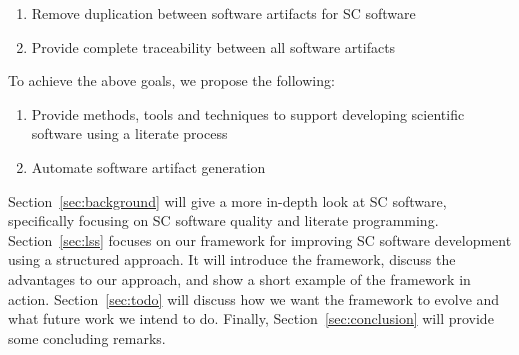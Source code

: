 \documentclass{sig-alternate-05-2015}
\begin{document}
\begin{enumerate}
\item Remove duplication between software artifacts for SC
  software \cite{WilsonEtAl2013}
\item Provide complete traceability between all software artifacts
\end{enumerate}


To achieve the above goals, we propose the following:

\begin{enumerate}
\item Provide methods, tools and techniques to support developing scientific
  software using a literate process
\item Automate software artifact generation
\end{enumerate}

Section~\ref{sec:background} will give a more in-depth look at SC software,
specifically focusing on SC software quality and literate programming. 
Section~\ref{sec:lss} focuses on our framework %
for improving SC software development using a structured approach. It will
introduce the framework, discuss the advantages to our approach, and show
a short example of the framework in action. Section~\ref{sec:todo} will discuss
how we want the framework to evolve and what future work we intend to do.
Finally, Section~\ref{sec:conclusion} will provide some concluding remarks.

%
%
%
%
%
%
\end{document}
